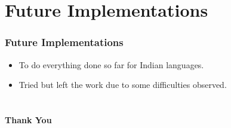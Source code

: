 \documentclass{beamer} %
\theoremstyle{definition} %
\begin{document}
\section[Future Work]{Future Implementations}
\begin{frame}
\frametitle{Future Implementations}
\begin{itemize}
\item To do everything done so far for Indian languages.
\item Tried but left the work due to some difficulties observed.
\end{itemize}
\end{frame}

\section[]{}
\begin{frame}
\textbf{Thank You}
\end{frame}
\end{document}
